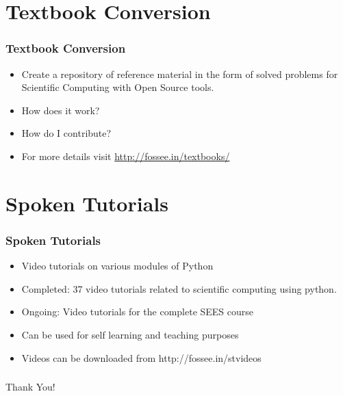 \documentclass{beamer}
\begin{document}
\section{Textbook Conversion}

\begin{frame}	
	\frametitle{Textbook Conversion}
	\begin{itemize}
	\item Create a repository of reference material in the form of solved problems for Scientific Computing with Open Source tools.
	\item How does it work?
	\item How do I contribute?
	\item For more details visit {\url{http://fossee.in/textbooks/}}
	\end{itemize}
\end{frame}

\section{Spoken Tutorials}

\begin{frame}
	\frametitle{Spoken Tutorials}
	\begin{itemize}
	\item Video tutorials on various modules of Python
	\item Completed: 37 video tutorials related to scientific computing using python.
	\item Ongoing: Video tutorials for the complete SEES course
	\item Can be used for self learning and teaching purposes
	\item Videos can be downloaded from http://fossee.in/stvideos	
	\end{itemize}
\end{frame}


\begin{frame}
\frametitle{}   
  \begin{center}
    \Huge{Thank You!}
  \end{center}
\end{frame}
\end{document}
